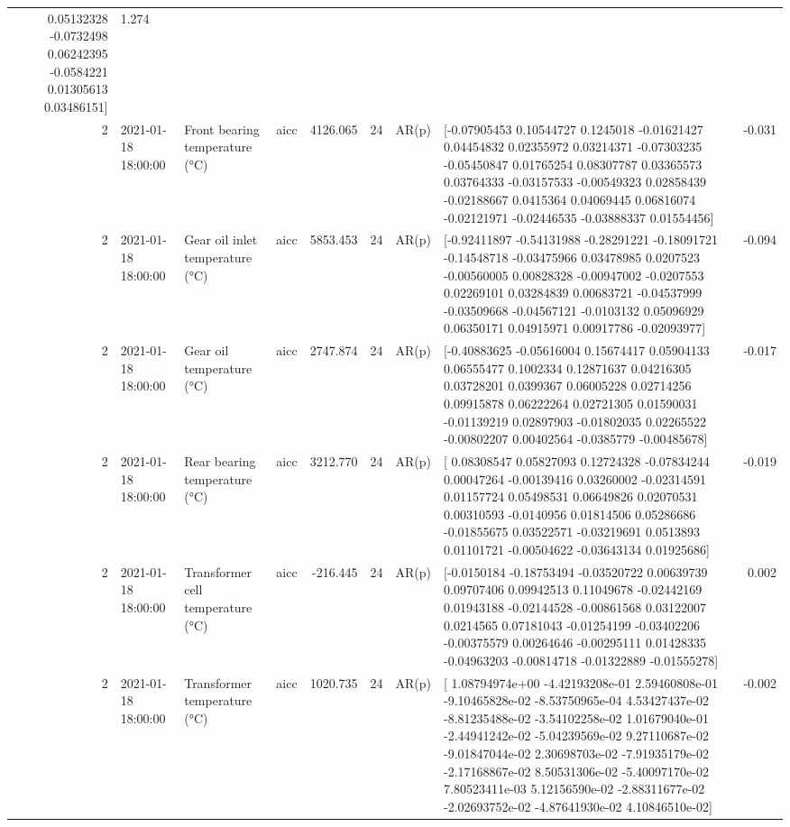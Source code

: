 \begin{tabular}{rlllrrllr}
  0.05132328 -0.0732498   0.06242395 -0.0584221   0.01305613  0.03486151] & 1.274 \\
2 & 2021-01-18 18:00:00 & Front bearing temperature (°C) & aicc & 4126.065 & 24 & AR(p) & [-0.07905453  0.10544727  0.1245018  -0.01621427  0.04454832  0.02355972
  0.03214371 -0.07303235 -0.05450847  0.01765254  0.08307787  0.03365573
  0.03764333 -0.03157533 -0.00549323  0.02858439 -0.02188667  0.0415364
  0.04069445  0.06816074 -0.02121971 -0.02446535 -0.03888337  0.01554456] & -0.031 \\
2 & 2021-01-18 18:00:00 & Gear oil inlet temperature (°C) & aicc & 5853.453 & 24 & AR(p) & [-0.92411897 -0.54131988 -0.28291221 -0.18091721 -0.14548718 -0.03475966
  0.03478985  0.0207523  -0.00560005  0.00828328 -0.00947002 -0.0207553
  0.02269101  0.03284839  0.00683721 -0.04537999 -0.03509668 -0.04567121
 -0.0103132   0.05096929  0.06350171  0.04915971  0.00917786 -0.02093977] & -0.094 \\
2 & 2021-01-18 18:00:00 & Gear oil temperature (°C) & aicc & 2747.874 & 24 & AR(p) & [-0.40883625 -0.05616004  0.15674417  0.05904133  0.06555477  0.1002334
  0.12871637  0.04216305  0.03728201  0.0399367   0.06005228  0.02714256
  0.09915878  0.06222264  0.02721305  0.01590031 -0.01139219  0.02897903
 -0.01802035  0.02265522 -0.00802207  0.00402564 -0.0385779  -0.00485678] & -0.017 \\
2 & 2021-01-18 18:00:00 & Rear bearing temperature (°C) & aicc & 3212.770 & 24 & AR(p) & [ 0.08308547  0.05827093  0.12724328 -0.07834244  0.00047264 -0.00139416
  0.03260002 -0.02314591  0.01157724  0.05498531  0.06649826  0.02070531
  0.00310593 -0.0140956   0.01814506  0.05286686 -0.01855675  0.03522571
 -0.03219691  0.0513893   0.01101721 -0.00504622 -0.03643134  0.01925686] & -0.019 \\
2 & 2021-01-18 18:00:00 & Transformer cell temperature (°C) & aicc & -216.445 & 24 & AR(p) & [-0.0150184  -0.18753494 -0.03520722  0.00639739  0.09707406  0.09942513
  0.11049678 -0.02442169  0.01943188 -0.02144528 -0.00861568  0.03122007
  0.0214565   0.07181043 -0.01254199 -0.03402206 -0.00375579  0.00264646
 -0.00295111  0.01428335 -0.04963203 -0.00814718 -0.01322889 -0.01555278] & 0.002 \\
2 & 2021-01-18 18:00:00 & Transformer temperature (°C) & aicc & 1020.735 & 24 & AR(p) & [ 1.08794974e+00 -4.42193208e-01  2.59460808e-01 -9.10465828e-02
 -8.53750965e-04  4.53427437e-02 -8.81235488e-02 -3.54102258e-02
  1.01679040e-01 -2.44941242e-02 -5.04239569e-02  9.27110687e-02
 -9.01847044e-02  2.30698703e-02 -7.91935179e-02 -2.17168867e-02
  8.50531306e-02 -5.40097170e-02  7.80523411e-03  5.12156590e-02
 -2.88311677e-02 -2.02693752e-02 -4.87641930e-02  4.10846510e-02] & -0.002 \\
\bottomrule
\end{tabular}
